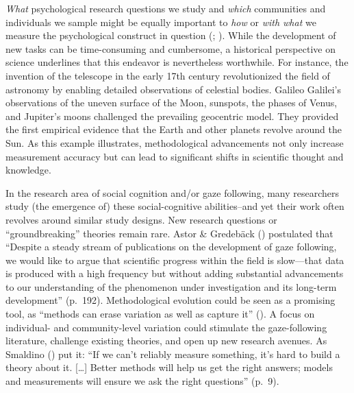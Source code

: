 \documentclass[
]{scrbook}
\begin{document}
\emph{What} psychological research questions we study and \emph{which} communities and individuals we sample might be equally important to \emph{how} or \emph{with what} we measure the psychological construct in question (; ). While the development of new tasks can be time-consuming and cumbersome, a historical perspective on science underlines that this endeavor is nevertheless worthwhile. For instance, the invention of the telescope in the early 17th century revolutionized the field of astronomy by enabling detailed observations of celestial bodies. Galileo Galilei's observations of the uneven surface of the Moon, sunspots, the phases of Venus, and Jupiter's moons challenged the prevailing geocentric model. They provided the first empirical evidence that the Earth and other planets revolve around the Sun. As this example illustrates, methodological advancements not only increase measurement accuracy but can lead to significant shifts in scientific thought and knowledge.

In the research area of social cognition and/or gaze following, many researchers study (the emergence of) these social-cognitive abilities\thinspace --\thinspace and yet their work often revolves around similar study designs. New research questions or ``groundbreaking'' theories remain rare. Astor \& Gredebäck () postulated that ``Despite a steady stream of publications on the development of gaze following, we would like to argue that scientific progress within the field is slow---that data is produced with a high frequency but without adding substantial advancements to our understanding of the phenomenon under investigation and its long-term development'' (p.~192). Methodological evolution could be seen as a promising tool, as ``methods can erase variation as well as capture it'' (). A focus on individual- and community-level variation could stimulate the gaze-following literature, challenge existing theories, and open up new research avenues. As Smaldino () put it: ``If we can't reliably measure something, it's hard to build a theory about it. {[}\ldots{]} Better methods will help us get the right answers; models and measurements will ensure we ask the right questions'' (p.~9).
\end{document}
